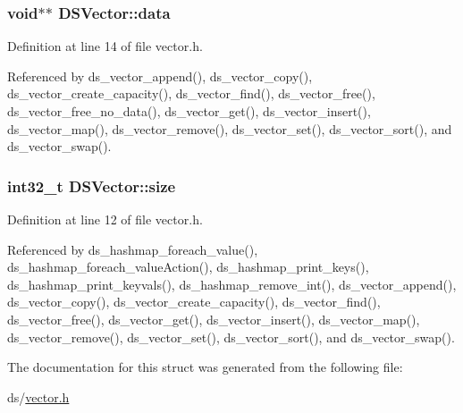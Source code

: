 \subsubsection[{\texorpdfstring{data}{data}}]{\setlength{\rightskip}{0pt plus 5cm}void$\ast$$\ast$ D\+S\+Vector\+::data}\hypertarget{structDSVector_a20b72155d8e63dbc5fb5f1f0259c3d0f}{}\label{structDSVector_a20b72155d8e63dbc5fb5f1f0259c3d0f}


Definition at line 14 of file vector.\+h.



Referenced by ds\+\_\+vector\+\_\+append(), ds\+\_\+vector\+\_\+copy(), ds\+\_\+vector\+\_\+create\+\_\+capacity(), ds\+\_\+vector\+\_\+find(), ds\+\_\+vector\+\_\+free(), ds\+\_\+vector\+\_\+free\+\_\+no\+\_\+data(), ds\+\_\+vector\+\_\+get(), ds\+\_\+vector\+\_\+insert(), ds\+\_\+vector\+\_\+map(), ds\+\_\+vector\+\_\+remove(), ds\+\_\+vector\+\_\+set(), ds\+\_\+vector\+\_\+sort(), and ds\+\_\+vector\+\_\+swap().

\subsubsection[{\texorpdfstring{size}{size}}]{\setlength{\rightskip}{0pt plus 5cm}int32\+\_\+t D\+S\+Vector\+::size}\hypertarget{structDSVector_aec38b0e8c644101c621177cf1c298793}{}\label{structDSVector_aec38b0e8c644101c621177cf1c298793}


Definition at line 12 of file vector.\+h.



Referenced by ds\+\_\+hashmap\+\_\+foreach\+\_\+value(), ds\+\_\+hashmap\+\_\+foreach\+\_\+value\+Action(), ds\+\_\+hashmap\+\_\+print\+\_\+keys(), ds\+\_\+hashmap\+\_\+print\+\_\+keyvals(), ds\+\_\+hashmap\+\_\+remove\+\_\+int(), ds\+\_\+vector\+\_\+append(), ds\+\_\+vector\+\_\+copy(), ds\+\_\+vector\+\_\+create\+\_\+capacity(), ds\+\_\+vector\+\_\+find(), ds\+\_\+vector\+\_\+free(), ds\+\_\+vector\+\_\+get(), ds\+\_\+vector\+\_\+insert(), ds\+\_\+vector\+\_\+map(), ds\+\_\+vector\+\_\+remove(), ds\+\_\+vector\+\_\+set(), ds\+\_\+vector\+\_\+sort(), and ds\+\_\+vector\+\_\+swap().



The documentation for this struct was generated from the following file\+:\begin{DoxyCompactItemize}
\item 
ds/\hyperlink{vector_8h}{vector.\+h}\end{DoxyCompactItemize}
